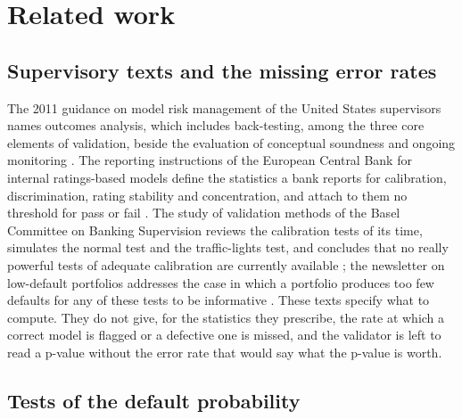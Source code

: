 \section{Related work}
\label{sec:related-work}

\subsection{Supervisory texts and the missing error rates}
\label{sec:rw-supervisory}

The 2011 guidance on model risk management of the United States supervisors names outcomes analysis, which includes back-testing, among the three core elements of validation, beside the evaluation of conceptual soundness and ongoing monitoring \citep{fed2011sr117}.
The reporting instructions of the European Central Bank for internal ratings-based models define the statistics a bank reports for calibration, discrimination, rating stability and concentration, and attach to them no threshold for pass or fail \citep{ecb2019instructions}.
The study of validation methods of the Basel Committee on Banking Supervision reviews the calibration tests of its time, simulates the normal test and the traffic-lights test, and concludes that no really powerful tests of adequate calibration are currently available \citep{bcbswp14}; the newsletter on low-default portfolios addresses the case in which a portfolio produces too few defaults for any of these tests to be informative \citep{bcbs2005lowdefault}.
These texts specify what to compute.
They do not give, for the statistics they prescribe, the rate at which a correct model is flagged or a defective one is missed, and the validator is left to read a p-value without the error rate that would say what the p-value is worth.

\subsection{Tests of the default probability}
\label{sec:rw-calibration}

